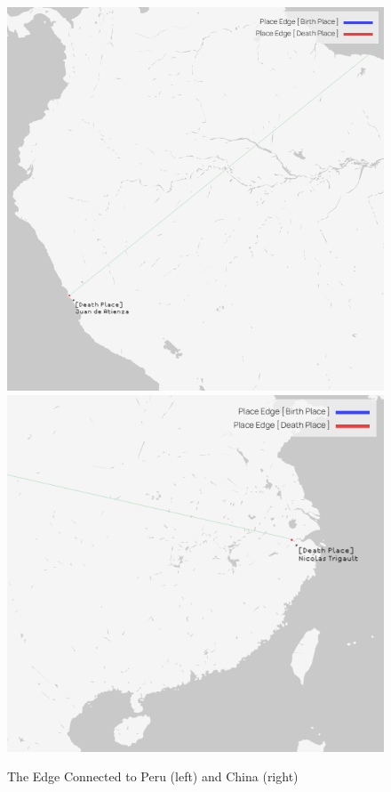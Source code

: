 \documentclass[12pt,a4paper,oneside]{book}
\begin{document}
\begin{sloppypar}
\begin{figure}[H]
\centering
\includegraphics[scale=0.4]{graph/Edge to Peru.png}
\includegraphics[scale=0.5]{graph/Edge to China.png}
\caption{The Edge Connected to Peru (left) and China (right)}
\label{fig:toPandC}
\end{figure}


\end{sloppypar}
\end{document}
